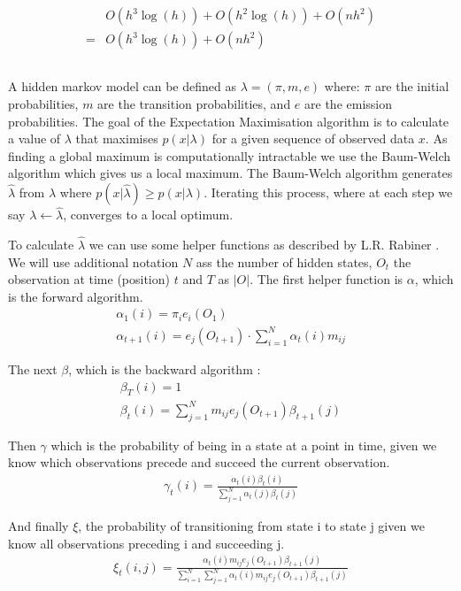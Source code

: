 \begin{align*}
&O(h^3 \log(h)) + O(h^2 \log(h)) + O(nh^2) \\
=& O(h^3 \log(h)) + O(nh^2)
\end{align*}



\subsection{}
A hidden markov model can be defined as $\lambda = (\pi, m, e)$ where: $\pi$ are the initial probabilities, $m$ are the transition probabilities, and $e$ are the emission probabilities.
The goal of the Expectation Maximisation algorithm is to calculate a value of $\lambda$ that maximises $p(x|\lambda)$ for a given sequence of observed data $x$. As finding a global maximum is computationally intractable we use the Baum-Welch algorithm which gives us a local maximum. The Baum-Welch algorithm generates $\hat{\lambda}$ from $\lambda$ where $p(x|\hat{\lambda}) \geq p(x|\lambda)$. Iterating this process, where at each step we say $\lambda \gets \hat{\lambda}$, converges to a local optimum.

To calculate $\hat{\lambda}$ we can use some helper functions as described by L.R. Rabiner \cite{em}. We will use additional notation $N$ ass the number of hidden states, $O_t$ the observation at time (position) $t$ and $T$ as $|O|$.  The first helper function is $\alpha$, which is the forward algorithm.
\begin{gather*}
    \alpha_1(i) = \pi_i e_i(O_1)\\
    \alpha_{t+1}(i) = e_j(O_{t+1}) \cdot \sum_{i=1}^N\alpha_t(i)m_{ij}
\end{gather*}

The next $\beta$, which is the backward algorithm :
\begin{gather*}
    \beta_T(i)=1\\
    \beta_t(i)=\sum_{j=1}^N m_{ij} e_j(O_{t+1}) \beta_{t+1}(j)
\end{gather*}

Then $\gamma$ which is the probability of being in a state at a point in time, given we know which observations precede and succeed the current observation.
\begin{gather*}
    \gamma_t(i) = \frac{\alpha_t(i) \beta_t(i)}{\sum_{j=1}^N \alpha_t(j) \beta_t(j)}
\end{gather*}

And finally $\xi$, the probability of transitioning from state i to state j given we know all observations preceding i and succeeding j.
\begin{gather*}
    \xi_t(i, j) = \frac{\alpha_t(i) m_{ij} e_j(O_{t+1}) \beta_{t+1}(j)}{\sum_{i=1}^N \sum_{j=1}^N \alpha_t(i) m_{ij} e_j(O_{t+1}) \beta_{t+1}(j)}
\end{gather*}

